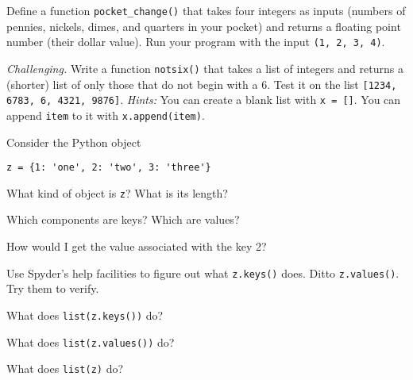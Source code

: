 \documentclass[11pt]{exam}
\begin{document}
\begin{questions}




\item Define a function \verb|pocket_change()| that takes four integers as inputs
(numbers of pennies, nickels, dimes, and quarters in your pocket)
and returns a floating point number (their dollar value).
Run your program with the input {\tt (1, 2, 3, 4)}.

\item {\it Challenging.\/}
Write a function {\tt notsix()} that takes a list of integers
and returns a (shorter) list of only those that do not begin with a 6.
Test it on the list {\tt [1234, 6783, 6, 4321, 9876]}.  
{\it Hints:}  You can create a blank list with {\tt x = []}.
You can append  {\tt item} to it with {\tt x.append(item)}.



\item Consider the Python object
\begin{verbatim}
z = {1: 'one', 2: 'two', 3: 'three'}
\end{verbatim}
\begin{parts}
\item What kind of object is {\tt z}?  What is its length?
\item Which components are keys?  Which are values?
\item How would I get the value associated with the key 2?
\item Use Spyder's help facilities to figure out what {\tt z.keys()} does.
Ditto {\tt z.values()}.  Try them to verify.
\item What does {\tt list(z.keys())} do?
\item What does {\tt list(z.values())} do?
\item What does {\tt list(z)} do?
\end{parts}



\end{questions}
\end{document}
